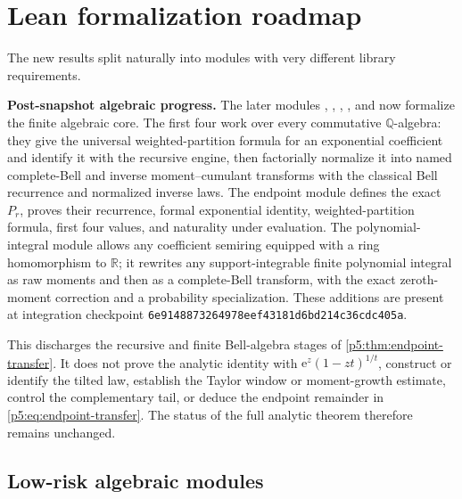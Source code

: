 \documentclass[11pt]{article}
\numberwithin{equation}{section}
\theoremstyle{definition}
\theoremstyle{remark}
\newcommand{\e}{\mathrm e}
\begin{document}
\section{Lean formalization roadmap}

The new results split naturally into modules with very different library
requirements.

\begin{boxedremark}
\textbf{Post-snapshot algebraic progress.}
The later modules ,
, ,
, and
 now formalize the finite algebraic
core.  The first four work over every commutative \(\mathbb Q\)-algebra: they
give the universal weighted-partition formula for an exponential coefficient
and identify it with the recursive
 engine, then factorially normalize it
into named complete-Bell and inverse moment--cumulant transforms with the
classical Bell recurrence and normalized inverse laws.  The endpoint module
defines the exact \(P_r\), proves their recurrence, formal exponential identity,
weighted-partition formula, first four values, and naturality under evaluation.
The polynomial-integral module allows any coefficient semiring equipped with
a ring homomorphism to \(\mathbb R\); it rewrites any support-integrable finite
polynomial integral as raw moments and then as a complete-Bell transform, with
the exact zeroth-moment correction and a probability specialization.  These additions are
present at integration checkpoint
\texttt{6e9148873264978eef43181d6bd214c36cdc405a}.

This discharges the recursive and finite Bell-algebra stages of
\cref{p5:thm:endpoint-transfer}.  It does not prove the analytic identity with
\(\e^z(1-zt)^{1/t}\), construct or identify the tilted law, establish the
Taylor window or moment-growth estimate, control the complementary tail, or
deduce the endpoint remainder in \eqref{p5:eq:endpoint-transfer}.  The status of
the full analytic theorem therefore remains unchanged.
\end{boxedremark}

\subsection{Low-risk algebraic modules}
\end{document}
